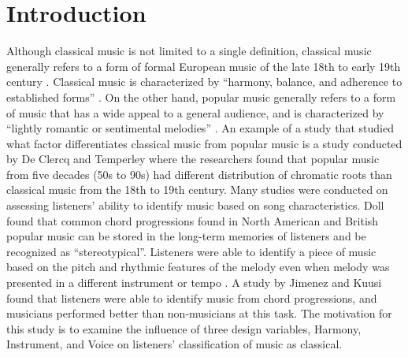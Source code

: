 \documentclass{article}
\begin{document}
\section{Introduction}



Although classical music is not limited to a single definition, classical music generally refers to a form of formal European music of the late 18th to early 19th century \parencite[]{oxford-dict}. Classical music is characterized by ``harmony, balance, and adherence to established forms'' \parencite[]{oxford-dict}. On the other hand, popular music generally refers to a form of music that has a wide appeal to a general audience, and is characterized by ``lightly romantic or sentimental melodies'' \parencite[]{collins-dict}. An example of a study that studied what factor differentiates classical music from popular music is a study conducted by De Clercq and Temperley \parencite*{declercq-2011} where the researchers found that popular music from five decades (50s to 90s) had different distribution of chromatic roots than classical music from the 18th to 19th century. Many studies were conducted on assessing listeners' ability to identify music based on song characteristics. Doll \parencite*{doll-2017} found that common chord progressions found in North American and British popular music can be stored in the long-term memories of listeners and be recognized as ``stereotypical''. Listeners were able to identify a piece of music based on the pitch and rhythmic features of the melody even when melody was presented in a different instrument or tempo \parencite[]{warren-1991, andrews-1998, dowling-2008}. A study by Jimenez and Kuusi \parencite*{Jimenez-2018} found that listeners were able to identify music from chord progressions, and musicians performed better than non-musicians at this task. The motivation for this study is to examine the influence of three design variables, Harmony, Instrument, and Voice on listeners' classification of music as classical.
\end{document}
